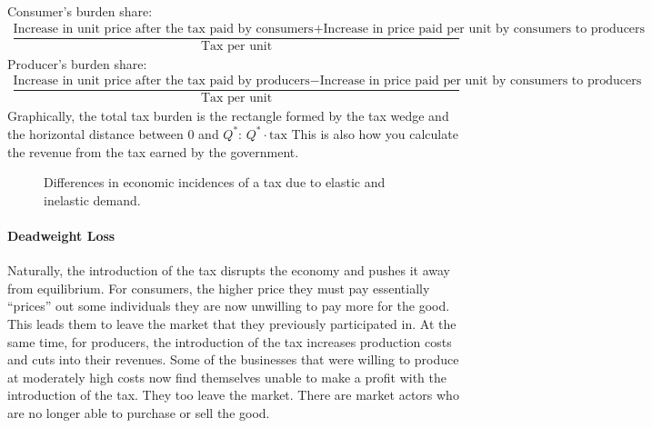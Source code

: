 \documentclass[letterpaper,10pt,english]{jupyterBook}
\let\sphinxpxdimen\pdfpxdimen\else\newdimen\sphinxpxdimen
\begin{document}
\sphinxAtStartPar
Consumer’s burden share:
\begin{equation*}
\begin{split}\dfrac{\text{Increase in unit price after the tax paid by consumers} + \text{Increase in price paid per unit by consumers to producers}}{\text{Tax per unit}}\end{split}
\end{equation*}
\sphinxAtStartPar
Producer’s burden share:
\begin{equation*}
\begin{split}\dfrac{\text{Increase in unit price after the tax paid by producers} - \text{Increase in price paid per unit by consumers to producers}}{\text{Tax per unit}}\end{split}
\end{equation*}
\sphinxAtStartPar
Graphically, the total tax burden is the rectangle formed by the tax wedge and the horizontal distance between 0 and \(Q^*\): \(Q^* \cdot \text{tax}\) This is also how you calculate the revenue from the tax earned by the government.

\begin{figure}[htbp]
\centering
\capstart

\noindent\sphinxincludegraphics[width=900\sphinxpxdimen]{{fig6-elasticity-of-taxes}.png}
\caption{Differences in economic incidences of a tax due to elastic and inelastic demand.}\label{\detokenize{content/03-public/taxes-subsidies:elasticity-of-taxes}}\end{figure}


\paragraph{Deadweight Loss}
\label{\detokenize{content/03-public/taxes-subsidies:deadweight-loss}}
\sphinxAtStartPar
Naturally, the introduction of the tax disrupts the economy and pushes it away from equilibrium. For consumers, the higher price they must pay essentially “prices” out some individuals \sphinxhyphen{} they are now unwilling to pay more for the good. This leads them to leave the market that they previously participated in. At the same time, for producers, the introduction of the tax increases production costs and cuts into their revenues. Some of the businesses that were willing to produce at moderately high costs now find themselves unable to make a profit with the introduction of the tax. They too leave the market. There are market actors who are no longer able to purchase or sell the good.
\end{document}
